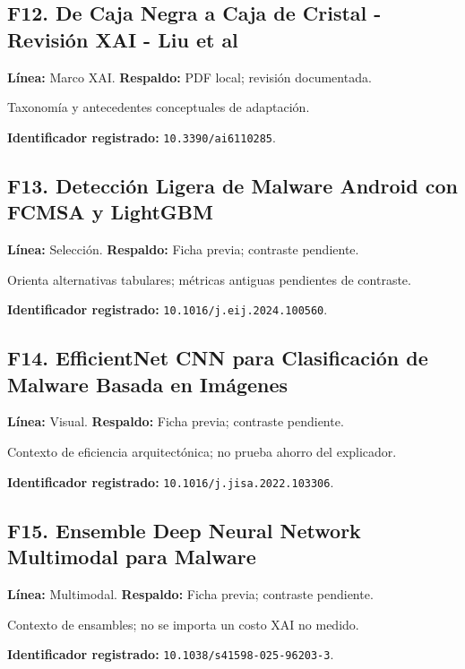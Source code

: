 \begin{samepage}
\subsection*{F12. De Caja Negra a Caja de Cristal - Revisión XAI - Liu et al}
\noindent\textbf{Línea:} Marco XAI. \textbf{Respaldo:} PDF local; revisión documentada. \parencite{Liu2025GlassBox}

Taxonomía y antecedentes conceptuales de adaptación.

\noindent\textbf{Identificador registrado:} \nolinkurl{10.3390/ai6110285}.

\end{samepage}
\begin{samepage}
\subsection*{F13. Detección Ligera de Malware Android con FCMSA y LightGBM}
\noindent\textbf{Línea:} Selección. \textbf{Respaldo:} Ficha previa; contraste pendiente. 

Orienta alternativas tabulares; métricas antiguas pendientes de contraste.

\noindent\textbf{Identificador registrado:} \nolinkurl{10.1016/j.eij.2024.100560}.

\end{samepage}
\begin{samepage}
\subsection*{F14. EfficientNet CNN para Clasificación de Malware Basada en Imágenes}
\noindent\textbf{Línea:} Visual. \textbf{Respaldo:} Ficha previa; contraste pendiente. 

Contexto de eficiencia arquitectónica; no prueba ahorro del explicador.

\noindent\textbf{Identificador registrado:} \nolinkurl{10.1016/j.jisa.2022.103306}.

\end{samepage}
\begin{samepage}
\subsection*{F15. Ensemble Deep Neural Network Multimodal para Malware}
\noindent\textbf{Línea:} Multimodal. \textbf{Respaldo:} Ficha previa; contraste pendiente. 

Contexto de ensambles; no se importa un costo XAI no medido.

\noindent\textbf{Identificador registrado:} \nolinkurl{10.1038/s41598-025-96203-3}.

\end{samepage}
